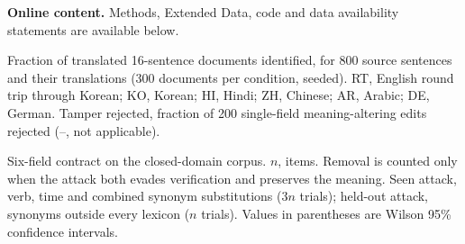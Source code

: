 \documentclass[12pt]{article}
\begin{document}
\bigskip
\noindent\textbf{Online content.} Methods, Extended Data, code and data availability statements are available below.

\renewcommand{\refname}{References}


\clearpage
\begin{table}[p]
\caption{Identification of translated documents at a common 1\% false-positive rate}\label{tab:matched}
{\singlespacing\footnotesize\noindent\par
\smallskip\noindent Fraction of translated 16-sentence documents identified, for 800 source sentences and their translations (300 documents per condition, seeded). RT, English round trip through Korean; KO, Korean; HI, Hindi; ZH, Chinese; AR, Arabic; DE, German. Tamper rejected, fraction of 200 single-field meaning-altering edits rejected (--, not applicable).\par}
\end{table}

\clearpage
\begin{table}[p]
\caption{Adaptive rewriting attacks and open-vocabulary extraction}\label{tab:adaptive}
{\singlespacing\footnotesize\noindent\par
\smallskip\noindent Six-field contract on the closed-domain corpus. $n$, items. Removal is counted only when the attack both evades verification and preserves the meaning. Seen attack, verb, time and combined synonym substitutions ($3n$ trials); held-out attack, synonyms outside every lexicon ($n$ trials). Values in parentheses are Wilson 95\% confidence intervals.\par}
\end{table}
\end{document}
